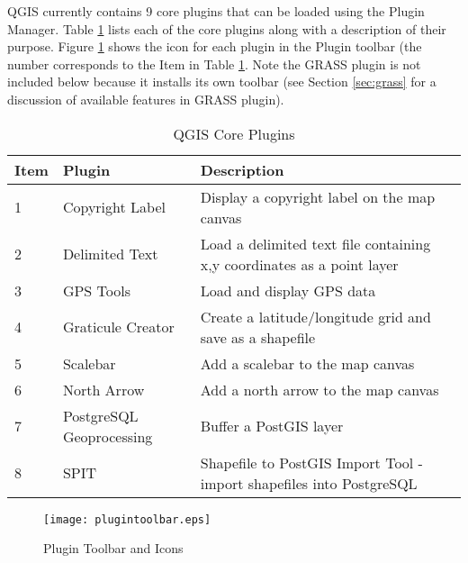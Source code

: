 QGIS currently contains 9 core plugins that can be loaded using the Plugin
Manager. Table \ref{tab:core_plugins} lists each of the core plugins along
with a description of their purpose. Figure \ref{fig:plugintoolbar} shows the
icon for each plugin in the Plugin toolbar (the number corresponds to the Item
in Table \ref{tab:core_plugins}. Note the GRASS plugin is not included below
because it installs its own toolbar (see Section \ref{sec:grass} for a
discussion of available features in GRASS plugin).

\begin{table}[h]
\centering
\caption{QGIS Core Plugins}\label{tab:core_plugins}\medskip
\small
 \begin{tabular}{|l|l|p{4in}|}
\hline \textbf{Item} & \textbf{Plugin} & \textbf{Description} \\
\hline 1 & Copyright Label \index{plugins!copyright}& Display a copyright
label on the map canvas\\
\hline 2 & Delimited Text \index{plugins!delimited text}& Load a delimited
text file containing x,y coordinates as a point layer \\
\hline 3 & GPS Tools \index{plugins!gps}& Load and display GPS data \\
\hline 4 & Graticule Creator \index{plugins!graticule}& Create a
latitude/longitude grid and save as a shapefile\\
\hline 5 & Scalebar \index{plugins!scalebar}& Add a scalebar to the map
canvas\\
\hline 6 & North Arrow \index{plugins!north arrow}& Add a north arrow to the
map canvas\\
\hline 7 & PostgreSQL Geoprocessing \index{plugins!geoprocessing}& Buffer a
PostGIS layer \\
\hline 8 & SPIT \index{plugins!SPIT}& Shapefile to PostGIS Import Tool -
import shapefiles into PostgreSQL\\
\hline
\end{tabular}
\end{table}

\normalsize

\begin{figure}[ht]
   \begin{center}
   \caption{Plugin Toolbar and Icons}\label{fig:plugintoolbar}\smallskip
   \texttt{[image: plugintoolbar.eps]}
\end{center}  
\end{figure}

\begin{Tip}\caption{\textsc{Plugins Settings Saved to Project}}
\end{Tip}

